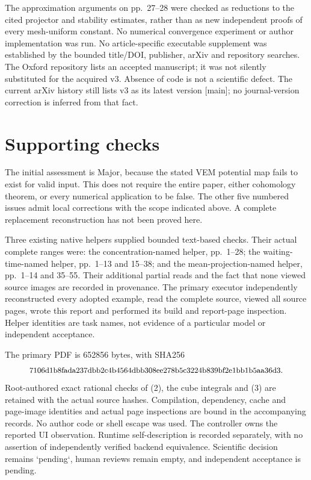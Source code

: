 \documentclass[10pt]{article}
\begin{document}
The approximation arguments on pp. 27–28 were checked as reductions to the cited projector and stability estimates, rather than as new independent proofs of every mesh-uniform constant. No numerical convergence experiment or author implementation was run. No article-specific executable supplement was established by the bounded title/DOI, publisher, arXiv and repository searches. The Oxford repository lists an accepted manuscript; it was not silently substituted for the acquired v3. Absence of code is not a scientific defect. The current arXiv history still lists v3 as its latest version [main]; no journal-version correction is inferred from that fact.\par
\section*{Supporting checks}
The initial assessment is Major, because the stated VEM potential map fails to exist for valid input. This does not require the entire paper, either cohomology theorem, or every numerical application to be false. The other five numbered issues admit local corrections with the scope indicated above. A complete replacement reconstruction has not been proved here.\par
Three existing native helpers supplied bounded text-based checks. Their actual complete ranges were: the concentration-named helper, pp. 1–28; the waiting-time-named helper, pp. 1–13 and 15–38; and the mean-projection-named helper, pp. 1–14 and 35–55. Their additional partial reads and the fact that none viewed source images are recorded in provenance. The primary executor independently reconstructed every adopted example, read the complete source, viewed all source pages, wrote this report and performed its build and report-page inspection. Helper identities are task names, not evidence of a particular model or independent acceptance.\par
The primary PDF is 652856 bytes, with SHA256 \[\text{\small{7106d1b8fada237dbb2c4b4564dbb308ee278b5c3224b839bf2e1bb1b5aa36d3}}.\] Root-authored exact rational checks of (2), the cube integrals and (3) are retained with the actual source hashes. Compilation, dependency, cache and page-image identities and actual page inspections are bound in the accompanying records. No author code or shell escape was used. The controller owns the reported UI observation. Runtime self-description is recorded separately, with no assertion of independently verified backend equivalence. Scientific decision remains `pending`, human reviews remain empty, and independent acceptance is pending.\par
\end{document}
